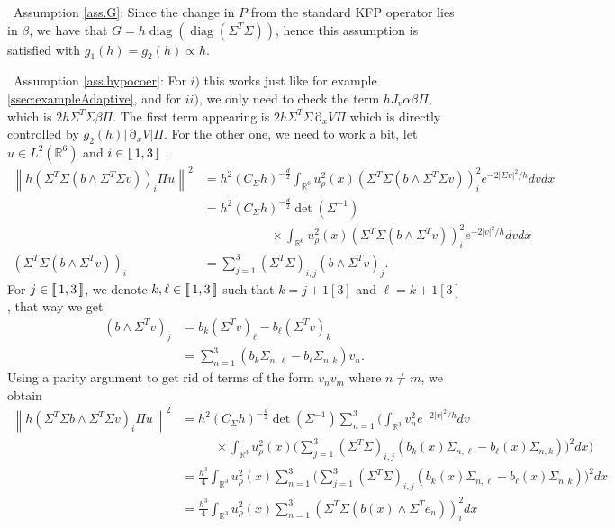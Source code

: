 \documentclass[12pt]{amsart}
\newcommand{\diag}{\operatorname{diag}}
\newcommand{\R}{\mathbb R}
\numberwithin{equation}{section}
\numberwithin{figure}{section}
\DeclareMathOperator{\p}{\partial}
\newcommand{\vvert}[1]{\left\lVert#1\right\rVert}
\newcommand{\lb}{\operatorname{[\negthinspace [}}
\newcommand{\rb}{\operatorname{]\negthinspace ]}}
\begin{document}
\textbullet\ Assumption \ref{ass.G}: Since the change in $P$ from the standard KFP operator lies in $\beta$, we have that $G = h\diag(\diag(\Sigma^T\Sigma))$, hence this assumption is satisfied with $g_1(h) = g_2(h) \propto h$.

\textbullet\ Assumption \ref{ass.hypocoer}: For $i)$ this works just like for example \ref{ssec:exampleAdaptive}, and for $ii)$, we only need to check the term $hJ_v\alpha\beta\Pi$, which is $2h\Sigma^T\Sigma\beta\Pi$. The first term appearing is $2h\Sigma^T\Sigma\p_xV\Pi$ which is directly controlled by $g_2(h)|\p_xV|\Pi$. For the other one, we need to work a bit, let $u\in L^2(\R^6)$ and $i\in\lb1,3\rb$%
,
\begin{equation*}
\begin{aligned}
    \vvert{h(\Sigma^T\Sigma (b\wedge\Sigma^T\Sigma v))_i\Pi u}^2 &= h^2(C_\Sigma h)^{-\frac d2}\int_{\R^6}u_\rho^2(x)(\Sigma^T\Sigma (b\wedge\Sigma^T\Sigma v))_i^2e^{-2|\Sigma v|^2/h}dvdx\\
    &= h^2(C_\Sigma h)^{-\frac d2}\det(\Sigma^{-1})\\
    &\phantom{********}\times\int_{\R^6}u_\rho^2(x)(\Sigma^T\Sigma (b\wedge\Sigma^T v))_i^2e^{-2|v|^2/h}dvdx\\
    (\Sigma^T\Sigma (b\wedge\Sigma^T v))_i &= \sum_{j=1}^3(\Sigma^T\Sigma)_{i,j}(b\wedge\Sigma^T v)_j.
\end{aligned}
\end{equation*}
For %
$j\in\lb1,3\rb$, we denote $k,\ell\in\lb1,3\rb$ such that $k=j+1[3]$ and $\ell=k+1[3]$, that way we get
\begin{equation*}
\begin{aligned}
    (b\wedge\Sigma^T v)_j &= b_k(\Sigma^T v)_\ell - b_\ell(\Sigma^T v)_k\\
    &= \sum_{n=1}^3(b_k\Sigma_{n,\ell} - b_\ell\Sigma_{n,k})v_n.
\end{aligned}
\end{equation*}
Using a parity argument to get rid of terms of the form $v_nv_m$ where $n\neq m$, we %
obtain
\begin{equation*}
\begin{aligned}
    \vvert{h(\Sigma^T\Sigma b\wedge\Sigma^T\Sigma v)_i\Pi u}^2 &=h^2(C_\Sigma h)^{-\frac d2}\det(\Sigma^{-1})\sum_{n=1}^3\Bigg(\int_{\R^3}v_n^2e^{-2|v|^2/h}dv\\
    &\phantom{****}\times\int_{\R^3}u_\rho^2(x)\Big(\sum_{j=1}^3(\Sigma^T\Sigma)_{i,j}(b_k(x)\Sigma_{n,\ell} - b_\ell(x)\Sigma_{n,k})\Big)^2dx\Bigg)\\
    &= \frac{h^3}{4}\int_{\R^3}u_\rho^2(x)\sum_{n=1}^3\Big(\sum_{j=1}^3(\Sigma^T\Sigma)_{i,j}(b_k(x)\Sigma_{n,\ell} - b_\ell(x)\Sigma_{n,k})\Big)^2dx\\
    &= \frac{h^3}{4}\int_{\R^3}u_\rho^2(x)\sum_{n=1}^3(\Sigma^T\Sigma (b(x)\wedge\Sigma^T e_n))_i^2dx\\
\end{aligned}
\end{equation*}
\end{document}
